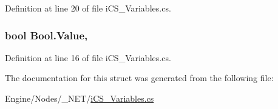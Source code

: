 Definition at line 20 of file i\+C\+S\+\_\+\+Variables.\+cs.

\hypertarget{struct_bool_a70bc573da6ea3bb93da5de3e442ada19}{
\subsubsection[{Value}]{\setlength{\rightskip}{0pt plus 5cm}bool Bool.\+Value\hspace{0.3cm}{\ttfamily [get]}, {\ttfamily [set]}}}\label{struct_bool_a70bc573da6ea3bb93da5de3e442ada19}


Definition at line 16 of file i\+C\+S\+\_\+\+Variables.\+cs.



The documentation for this struct was generated from the following file\+:\begin{DoxyCompactItemize}
\item 
Engine/\+Nodes/\+\_\+\+N\+E\+T/\hyperlink{i_c_s___variables_8cs}{i\+C\+S\+\_\+\+Variables.\+cs}\end{DoxyCompactItemize}
